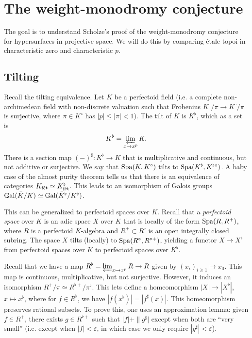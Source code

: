 
\section{The weight-monodromy conjecture}




The goal is to understand Scholze's proof of the weight-monodromy conjecture 
for hypersurfaces in projective space. We will do this by comparing \'etale 
topoi in characteristic zero and characteristic $p$. 





\subsection{Tilting}

Recall the tilting equivalence. Let $K$ be a perfectoid field (i.e. a complete 
non-archimedean field with non-discrete valuation such that Frobenius 
$K^\circ/\pi \to K^\circ/\pi$ is surjective, where $\pi\in K^\circ$ has 
$|p|\leqslant |\pi| <1$). The tilt of $K$ is $K^\flat$, which as a set is 
\[
  K^\flat = \varprojlim_{x\mapsto x^p} K .
\]
There is a section map $(-)^\sharp:K^\flat \to K$ that is multiplicative and 
continuous, but not additive or surjective. We say that 
$\operatorname{Spa}(K,K^\circ)$ tilts to $\operatorname{Spa}(K^\flat,K^{\flat\circ})$. A baby case of the 
almost purity theorem tells us that there is an equivalence of categories 
$K_{\textnormal{f\'et}} \simeq K^\flat_{\textnormal{f\'et}}$. This leads to an isomorphism of Galois groups 
$\operatorname{Gal}(\bar K/K) \simeq \operatorname{Gal}(\bar K^\flat/K^\flat)$. 

This can be generalized to perfectoid spaces over $K$. Recall that a 
\emph{perfectoid space} over $K$ is an adic space $X$ over $K$ that is locally 
of the form $\operatorname{Spa}(R,R^+)$, where $R$ is a perfectoid $K$-algebra and 
$R^+\subset R^\circ$ is an open integrally closed subring. The space $X$ tilts 
(locally) to $\operatorname{Spa}(R^\circ,R^{\circ +})$, yielding a functor $X\mapsto X^\flat$ 
from perfectoid spaces over $K$ to perfectoid spaces over $K^\flat$. 

Recall that we have a map $R^\flat = \varprojlim_{x\mapsto x^p} R \to R$ given 
by $(x_i)_{i\geqslant 1} \mapsto x_0$. This map is continuous, multiplicative, 
but not surjective. However, it induces an isomorphism 
$R^+/\pi \simeq R^{\flat +}/\pi^\flat$. This lets define a homeomorphism 
$|X|\to |X^\flat|$, $x\mapsto x^\flat$, where for $f\in R^\flat$, we have 
$|f(x^\flat)| = |f^\sharp(x)|$. This homeomorphism preserves rational 
subsets. To prove this, one uses an approximation lemma: given $f\in R^+$, 
there exists $g\in R^{\flat +}$ such that $|f|+\|g^\sharp|$ except when both 
are ``very small'' (i.e. except when $|f|<\varepsilon$, in which case we only 
require $|g^\sharp|<\varepsilon$). 

